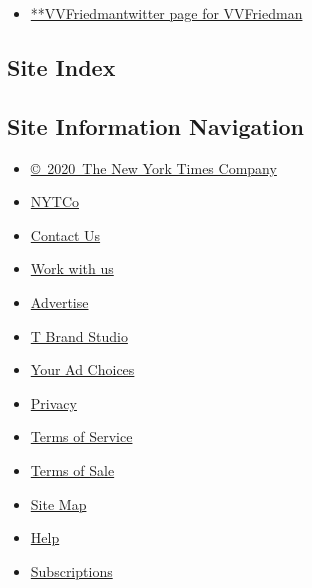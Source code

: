 \begin{itemize}
\tightlist
\item
  \href{https://twitter.com/VVFriedman}{**VVFriedmantwitter page for
  VVFriedman}
\end{itemize}

\hypertarget{site-index}{%
\subsection{Site Index}\label{site-index}}

\hypertarget{site-information-navigation}{%
\subsection{Site Information
Navigation}\label{site-information-navigation}}

\begin{itemize}
\tightlist
\item
  \href{https://help.nytimes.com/hc/en-us/articles/115014792127-Copyright-notice}{©~2020~The
  New York Times Company}
\end{itemize}

\begin{itemize}
\tightlist
\item
  \href{https://www.nytco.com/}{NYTCo}
\item
  \href{https://help.nytimes.com/hc/en-us/articles/115015385887-Contact-Us}{Contact
  Us}
\item
  \href{https://www.nytco.com/careers/}{Work with us}
\item
  \href{https://nytmediakit.com/}{Advertise}
\item
  \href{http://www.tbrandstudio.com/}{T Brand Studio}
\item
  \href{https://www.nytimes.com/privacy/cookie-policy\#how-do-i-manage-trackers}{Your
  Ad Choices}
\item
  \href{https://www.nytimes.com/privacy}{Privacy}
\item
  \href{https://help.nytimes.com/hc/en-us/articles/115014893428-Terms-of-service}{Terms
  of Service}
\item
  \href{https://help.nytimes.com/hc/en-us/articles/115014893968-Terms-of-sale}{Terms
  of Sale}
\item
  \href{https://spiderbites.nytimes.com}{Site Map}
\item
  \href{https://help.nytimes.com/hc/en-us}{Help}
\item
  \href{https://www.nytimes.com/subscription?campaignId=37WXW}{Subscriptions}
\end{itemize}
